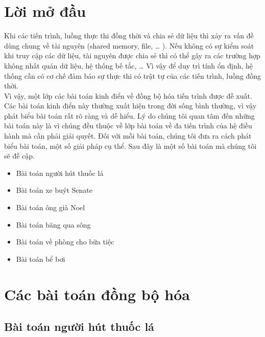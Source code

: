 \documentclass[12pt]{article}
\begin{document}
\newpage																		

\tableofcontents 

\newpage

\section{Lời mở đầu}

Khi các tiến trình, luồng thực thi đồng thời và chia sẻ dữ liệu thì xảy ra vấn đề dùng chung về tài nguyên (shared memory, file, … ). Nếu không có sự kiểm soát khi truy cập các dữ liệu, tài nguyên được chia sẻ thì có thể gây ra các trường hợp không nhất quán dữ liệu, hệ thống bế tắc, … Vì vậy để duy trì tính ổn định, hệ thống cần có cơ chế đảm bảo sự thực thi có trật tự của các tiến trình, luồng đồng thời.\\
Vì vậy, một lớp các bài toán kinh điển về đồng bộ hóa tiến trình được đề xuất. Các bài toán kinh điển này thường xuất hiện trong đời sống bình thường, vì vậy phát biểu bài toán rất rõ ràng và dễ hiểu. Lý do chúng tôi quan tâm đến những bài toán này là vì chúng đều thuộc về lớp bài toán về đa tiến trình của hệ điều hành mà cần phải giải quyết. Đối với mỗi bài toán, chúng tôi đưa ra cách phát biểu bài toán, một số giải pháp cụ thể. Sau đây là một số bài toán mà chúng tôi sẽ đề cập.
	\begin{itemize}
	\item Bài toán người hút thuốc lá
	\item Bài toán xe buýt Senate
	\item Bài toán ông già Noel
	\item Bài toán băng qua sông
	\item Bài toán về phòng cho bữa tiệc
	\item Bài toán bể bơi
	\end{itemize}
\newpage
\section{Các bài toán đồng bộ hóa}
	\subsection{Bài toán người hút thuốc lá}
\end{document}
